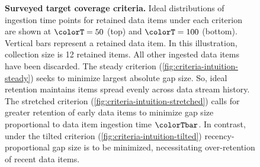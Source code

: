 \begin{figure}
    \begin{minipage}[]{\textwidth}
    \noindent{}%
    \hspace{-1.5ex}%
    {\vrule width 1pt}%
    \noindent{}%
    \hspace{-1ex}%
    {\vrule width 1pt}%
    \noindent{}%
    \hspace{-1ex}%
    {\vrule width 1pt}%
    \noindent{}%
    \end{minipage}
    \vspace{-0.15in}
    \caption{%
      \textbf{Surveyed target coverage criteria.}
      \footnotesize
      Ideal distributions of ingestion time points for retained data items under each criterion are shown at $\colorT=50$ (top) and $\colorT=100$ (bottom).
      Vertical bars represent a retained data item.
      In this illustration, collection size is 12 retained items.
      All other ingested data items have been discarded.
      The steady criterion (\ref{fig:criteria-intuition-steady}) seeks to minimize largest absolute gap size.
      So, ideal retention maintains items spread evenly across data stream history.
      The stretched criterion (\ref{fig:criteria-intuition-stretched}) calls for greater retention of early data items to minimize gap size proportional to data item ingestion time $\colorTbar$.
      In contrast, under the tilted criterion (\ref{fig:criteria-intuition-tilted}) recency-proportional gap size is to be minimized, necessitating over-retention of recent data items.
      }
    \label{fig:criteria-intuition}
\end{figure}
